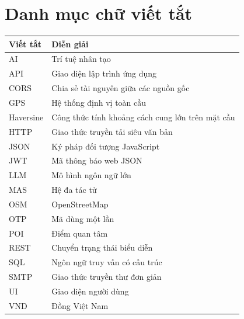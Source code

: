 \documentclass[vietnamese]{sicaireport}
\begin{document}
\chapter*{Danh mục chữ viết tắt}
\begin{table}[htbp]
    \centering
    \renewcommand{\arraystretch}{1.3}
    \begin{tabularx}{\textwidth}{p{3.2cm} X}
        \toprule
        \textbf{Viết tắt} & \textbf{Diễn giải} \\
        \midrule
        AI & Trí tuệ nhân tạo \\
        API & Giao diện lập trình ứng dụng \\
        CORS & Chia sẻ tài nguyên giữa các nguồn gốc \\
        GPS & Hệ thống định vị toàn cầu \\
        Haversine & Công thức tính khoảng cách cung lớn trên mặt cầu \\
        HTTP & Giao thức truyền tải siêu văn bản \\
        JSON & Ký pháp đối tượng JavaScript \\
        JWT & Mã thông báo web JSON \\
        LLM & Mô hình ngôn ngữ lớn \\
        MAS & Hệ đa tác tử \\
        OSM & OpenStreetMap \\
        OTP & Mã dùng một lần \\
        POI & Điểm quan tâm \\
        REST & Chuyển trạng thái biểu diễn \\
        SQL & Ngôn ngữ truy vấn có cấu trúc \\
        SMTP & Giao thức truyền thư đơn giản \\
        UI & Giao diện người dùng \\
        VND & Đồng Việt Nam \\
        \bottomrule
    \end{tabularx}
\end{table}
\clearpage

\setcounter{page}{1}







\clearpage
\printbibliography[heading=bibintoc,title={Tài liệu tham khảo}]

\clearpage


\clearpage

\end{document}
